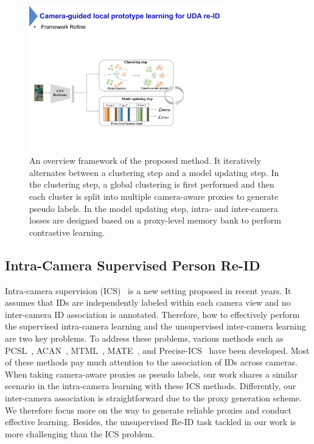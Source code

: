 \documentclass[letterpaper]{article} %
\begin{document}
\begin{figure}[t]
\centering
\centering
\includegraphics[width=0.76\textwidth]{./framework_v}
\caption{An overview framework of the proposed method. It iteratively alternates between a clustering step and a model updating step. In the clustering step, a global clustering is first performed and then each cluster is split into multiple camera-aware proxies to generate pseudo labels. In the model updating step, intra- and inter-camera losses are designed based on a proxy-level memory bank to perform contrastive learning.}
\label{fig_framework}
\end{figure}


\subsection{Intra-Camera Supervised Person Re-ID}
Intra-camera supervision (ICS)~\cite{zhu2019intra, qi2019progressive} is a new setting proposed in recent years. It assumes that IDs are independently labeled within each camera view and no inter-camera ID association is annotated. Therefore, how to effectively perform the supervised intra-camera learning and the unsupervised inter-camera learning are two key problems. To address these problems, various methods such as PCSL~\cite{qi2019progressive}, ACAN~\cite{qi2019intra}, MTML~\cite{zhu2019intra}, MATE~\cite{zhu2020intra}, and Precise-ICS~\cite{wang2021} have been developed. Most of these methods pay much attention to the association of IDs across cameras. When taking camera-aware proxies as pseudo labels, our work shares a similar scenario in the intra-camera learning with these ICS methods. Differently, our inter-camera association is straightforward due to the proxy generation scheme. We therefore focus more on the way to generate reliable proxies and conduct effective learning. Besides, the unsupervised Re-ID task tackled in our work is more challenging than the ICS problem.
\end{document}
